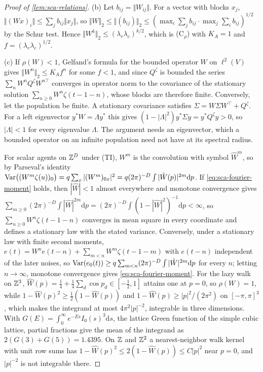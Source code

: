\begin{proof}[Proof of \cref{lem:sca-relations}]
(b) Let $b_{ij}=\Vert W_{ij}\Vert$. For a vector with blocks $x_j$, $\Vert(Wx)_i\Vert\le\sum_jb_{ij}\Vert x_j\Vert$, so $\Vert W\Vert_2\le\Vert(b_{ij})\Vert_2\le(\max_i\sum_jb_{ij}\cdot\max_j\sum_ib_{ij})^{1/2}$ by the Schur test. Hence $\Vert W^k\Vert_2\le(\lambda_r\lambda_c)^{k/2}$, which is \textup{(C$_\rho$)} with $K_A=1$ and $f=(\lambda_r\lambda_c)^{1/2}$.

(c) If $\rho(W)<1$, Gelfand's formula for the bounded operator $W$ on $\ell^2(V)$ gives $\Vert W^n\Vert_2\le K_Af^n$ for some $f<1$, and since $Q^\zeta$ is bounded the series $\sum_nW^nQ^\zeta W^{n\top}$ converges in operator norm to the covariance of the stationary solution $\sum_{n\ge0}W^n\zeta(t-1-n)$, whose blocks are therefore finite. Conversely, let the population be finite. A stationary covariance satisfies $\Sigma=W\Sigma W^\top+Q^\zeta$. For a left eigenvector $y^\ast W=\Lambda y^\ast$ this gives $(1-|\Lambda|^2)y^\ast\Sigma y=y^\ast Q^\zeta y>0$, so $|\Lambda|<1$ for every eigenvalue $\Lambda$. The argument needs an eigenvector, which a bounded operator on an infinite population need not have at its spectral radius.

For scalar agents on $\mathbb{Z}^D$ under \textup{(TI)}, $W^m$ is the convolution with symbol $\hat W^m$, so by Parseval's identity $\operatorname{Var}\bigl((W^m\zeta(u))_0\bigr)=q\sum_x|(W^m)_{0x}|^2=q(2\pi)^{-D}\int|\hat W(p)|^{2m}\mathrm dp$. If \eqref{eq:sca-fourier-moment} holds, then $|\hat W|<1$ almost everywhere and monotone convergence gives $\sum_{m\ge0}(2\pi)^{-D}\int|\hat W|^{2m}\mathrm dp=(2\pi)^{-D}\int(1-|\hat W|^2)^{-1}\mathrm dp<\infty$, so $\sum_{n\ge0}W^n\zeta(t-1-n)$ converges in mean square in every coordinate and defines a stationary law with the stated variance. Conversely, under a stationary law with finite second moments, $e(t)=W^ne(t-n)+\sum_{m<n}W^m\zeta(t-1-m)$ with $e(t-n)$ independent of the later noises, so $\operatorname{Var}(e_0(t))\ge q\sum_{m<n}(2\pi)^{-D}\int|\hat W|^{2m}\mathrm dp$ for every $n$; letting $n\to\infty$, monotone convergence gives \eqref{eq:sca-fourier-moment}. For the lazy walk on $\mathbb{Z}^3$, $\hat W(p)=\tfrac14+\tfrac14\sum_d\cos p_d\in[-\tfrac12,1]$ attains one at $p=0$, so $\rho(W)=1$, while $1-\hat W(p)^2\ge\tfrac12(1-\hat W(p))$ and $1-\hat W(p)\ge|p|^2/(2\pi^2)$ on $[-\pi,\pi]^3$, which makes the integrand at most $4\pi^2|p|^{-2}$, integrable in three dimensions. With $G(E)=\int_0^\infty e^{-Es}I_0(s)^3\mathrm ds$, the lattice Green function of the simple cubic lattice, partial fractions give the mean of the integrand as $2(G(3)+G(5))=1.4395$. On $\mathbb{Z}$ and $\mathbb{Z}^2$ a nearest-neighbor walk kernel with unit row sums has $1-\hat W(p)^2\le2(1-\hat W(p))\le C|p|^2$ near $p=0$, and $|p|^{-2}$ is not integrable there.
\end{proof}

